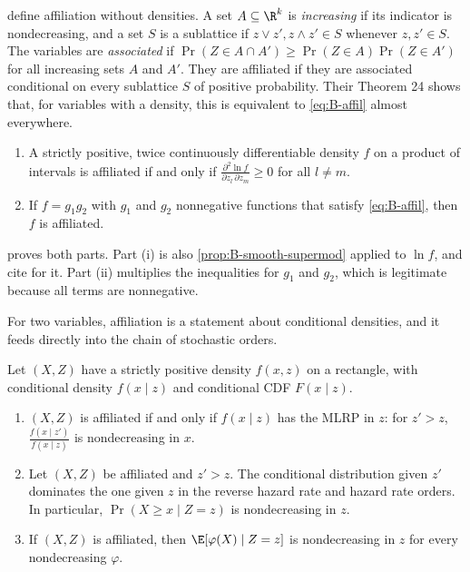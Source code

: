 \begin{remark}\label{rem:B-affil-general}
\citet[Appendix]{MilgromWeber1982} define affiliation without densities. A set $A \subseteq \R^k$ is \emph{increasing} if its
indicator is nondecreasing, and a set $S$ is a sublattice if $z \vee z', z \wedge z' \in S$ whenever $z, z' \in S$. The variables
are \emph{associated} if $\Pr(Z \in A \cap A') \geq \Pr(Z \in A)\Pr(Z \in A')$ for all increasing sets $A$ and $A'$. They are
affiliated if they are associated conditional on every sublattice $S$ of positive probability. Their Theorem 24
shows that, for variables with a density, this is equivalent to \eqref{eq:B-affil} almost everywhere.
\end{remark}

\begin{proposition}\label{prop:B-affil-char}
\leavevmode
\begin{enumerate}[label=(\roman*)]
  \item A strictly positive, twice continuously differentiable density $f$ on a product of intervals is affiliated if
  and only if $\frac{\partial^2\ln f}{\partial z_l\,\partial z_m} \geq 0$ for all $l \neq m$.
  \item If $f = g_1g_2$ with $g_1$ and $g_2$ nonnegative functions that satisfy \eqref{eq:B-affil}, then $f$ is affiliated.
\end{enumerate}
\end{proposition}

 proves both parts. Part (i) is also \cref{prop:B-smooth-supermod} applied to $\ln f$, and
\citet[p.~1098]{MilgromWeber1982} cite \citet[p.~310]{Topkis1978} for it. Part (ii) multiplies the inequalities
for $g_1$ and $g_2$, which is legitimate because all terms are nonnegative.

For two variables, affiliation is a statement about conditional densities, and it feeds directly into the chain of
stochastic orders.

\begin{proposition}\label{prop:B-affil-mlrp}
Let $(X, Z)$ have a strictly positive density $f(x, z)$ on a rectangle, with conditional density $f(x \mid z)$ and
conditional CDF $F(x \mid z)$.
\begin{enumerate}[label=(\roman*)]
  \item $(X, Z)$ is affiliated if and only if $f(x \mid z)$ has the MLRP in $z$: for $z' > z$, $\frac{f(x \mid z')}{f(x \mid z)}$ is
  nondecreasing in $x$.
  \item Let $(X, Z)$ be affiliated and $z' > z$. The conditional distribution given $z'$ dominates the one given $z$ in
  the reverse hazard rate and hazard rate orders. In particular, $\Pr(X \geq x \mid Z = z)$ is nondecreasing in $z$.
  \item If $(X, Z)$ is affiliated, then $\E[\varphi(X) \mid Z = z]$ is nondecreasing in $z$ for every nondecreasing $\varphi$.
\end{enumerate}
\end{proposition}

